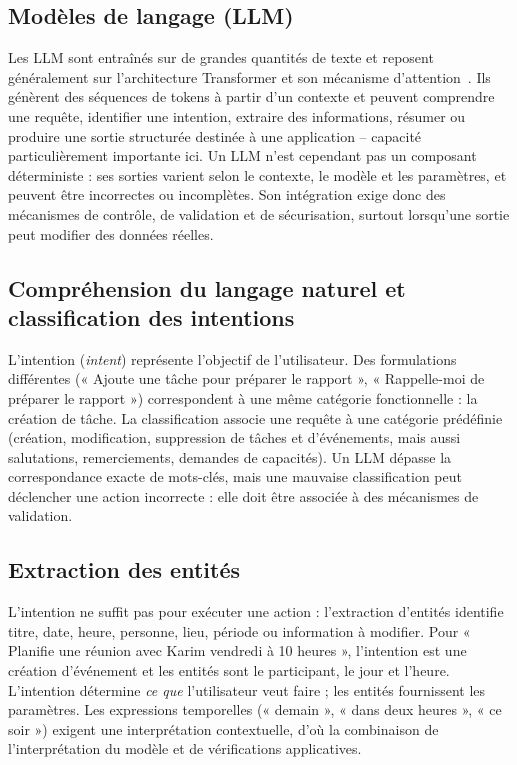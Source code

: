\documentclass[11pt,a4paper,openany,oneside]{report}
\begin{document}
\subsection{Modèles de langage (LLM)}
Les LLM sont entraînés sur de grandes quantités de texte et reposent généralement sur l'architecture Transformer et son mécanisme d'attention~\cite{vaswani2017}. Ils génèrent des séquences de tokens à partir d'un contexte et peuvent comprendre une requête, identifier une intention, extraire des informations, résumer ou produire une sortie structurée destinée à une application -- capacité particulièrement importante ici. Un LLM n'est cependant pas un composant déterministe : ses sorties varient selon le contexte, le modèle et les paramètres, et peuvent être incorrectes ou incomplètes. Son intégration exige donc des mécanismes de contrôle, de validation et de sécurisation, surtout lorsqu'une sortie peut modifier des données réelles.

\subsection{Compréhension du langage naturel et classification des intentions}
L'intention (\emph{intent}) représente l'objectif de l'utilisateur. Des formulations différentes (« Ajoute une tâche pour préparer le rapport », « Rappelle-moi de préparer le rapport ») correspondent à une même catégorie fonctionnelle : la création de tâche. La classification associe une requête à une catégorie prédéfinie (création, modification, suppression de tâches et d'événements, mais aussi salutations, remerciements, demandes de capacités). Un LLM dépasse la correspondance exacte de mots-clés, mais une mauvaise classification peut déclencher une action incorrecte : elle doit être associée à des mécanismes de validation.

\subsection{Extraction des entités}
L'intention ne suffit pas pour exécuter une action : l'extraction d'entités identifie titre, date, heure, personne, lieu, période ou information à modifier. Pour « Planifie une réunion avec Karim vendredi à 10 heures », l'intention est une création d'événement et les entités sont le participant, le jour et l'heure. L'intention détermine \emph{ce que} l'utilisateur veut faire ; les entités fournissent les paramètres. Les expressions temporelles (« demain », « dans deux heures », « ce soir ») exigent une interprétation contextuelle, d'où la combinaison de l'interprétation du modèle et de vérifications applicatives.
\end{document}
